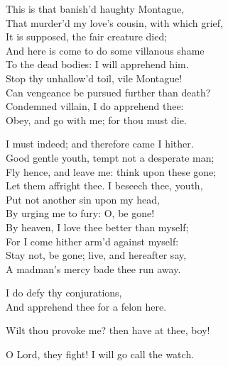\begin{speech}
This is that banish'd haughty Montague, \\
That murder'd my love's cousin, with which grief, \\
It is supposed, the fair creature died; \\
And here is come to do some villanous shame \\
To the dead bodies: I will apprehend him. 
\\
Stop thy unhallow'd toil, vile Montague! \\
Can vengeance be pursued further than death? \\
Condemned villain, I do apprehend thee: \\
Obey, and go with me; for thou must die. \\
\end{speech}
\begin{speech}
I must indeed; and therefore came I hither. \\
Good gentle youth, tempt not a desperate man; \\
Fly hence, and leave me: think upon these gone; \\
Let them affright thee.   I beseech thee, youth, \\
Put not another sin upon my head, \\
By urging me to fury: O, be gone! \\
By heaven, I love thee better than myself; \\
For I come hither arm'd against myself: \\
Stay not, be gone; live, and hereafter say, \\
A madman's mercy bade thee run away. \\
\end{speech}
\begin{speech}
I do defy thy conjurations, \\
And apprehend thee for a felon here. \\
\end{speech}
\begin{speech}
Wilt thou provoke me? then have at thee, boy!  \\
\end{speech}
\begin{speech}
O Lord, they fight!   I will go call the watch.  \\
\end{speech}
